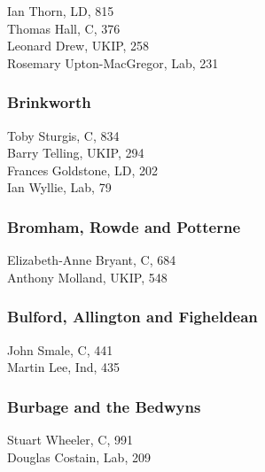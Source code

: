 \documentclass[a4paper,openany,10pt]{book}
\begin{document}
Ian Thorn, LD, 815\\
Thomas Hall, C, 376\\
Leonard Drew, UKIP, 258\\
{Rosemary Upton-MacGregor}, Lab, 231\\


\subsubsection*{Brinkworth}



Toby Sturgis, C, 834\\
Barry Telling, UKIP, 294\\
Frances Goldstone, LD, 202\\
Ian Wyllie, Lab, 79\\


\subsubsection*{Bromham, Rowde and Potterne}



Elizabeth-Anne Bryant, C, 684\\
Anthony Molland, UKIP, 548\\


\subsubsection*{Bulford, Allington and Figheldean}



John Smale, C, 441\\
Martin Lee, Ind, 435\\


\subsubsection*{Burbage and the Bedwyns}



Stuart Wheeler, C, 991\\
Douglas Costain, Lab, 209\\
\end{document}
